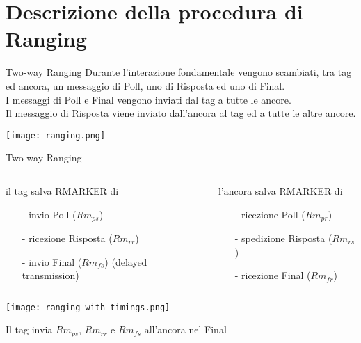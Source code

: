 \section{Descrizione della procedura di Ranging}
\begin{frame}{Two-way Ranging}
  Durante l'interazione fondamentale vengono scambiati, tra tag ed ancora,
  un messaggio di Poll, uno di Risposta ed uno di Final.\\
  I messaggi di \alert{Poll} e \alert{Final} vengono inviati dal tag a tutte
  le ancore. \\
  Il messaggio di \alert{Risposta} viene inviato dall'ancora
  al tag ed a tutte le altre ancore.
  \begin{center}
    \texttt{[image: ranging.png]}
  \end{center}
\end{frame}

\begin{frame}{Two-way Ranging}
  \begin{columns}[T]
    \begin{column}{0.5\textwidth}
      il \alert{tag} salva RMARKER di
      \begin{itemize}
      \item[-] invio Poll ($Rm_{ps}$)
      \item[-] ricezione Risposta ($Rm_{rr}$)
      \item[-] invio Final ($Rm_{fs}$) (delayed transmission)
      \end{itemize}
    \end{column}
    \begin{column}{0.5\textwidth}
      l'\alert{ancora} salva RMARKER di
      \begin{itemize}
      \item[-] ricezione Poll ($Rm_{pr}$)
      \item[-] spedizione Risposta ($Rm_{rs}$)
      \item[-] ricezione Final ($Rm_{fr}$)
      \end{itemize}
    \end{column}
  \end{columns}
  \begin{center}
    \texttt{[image: ranging\_with\_timings.png]}
  \end{center}
  Il tag invia $Rm_{ps}$, $Rm_{rr}$ e $Rm_{fs}$ all'ancora nel Final
\end{frame}

